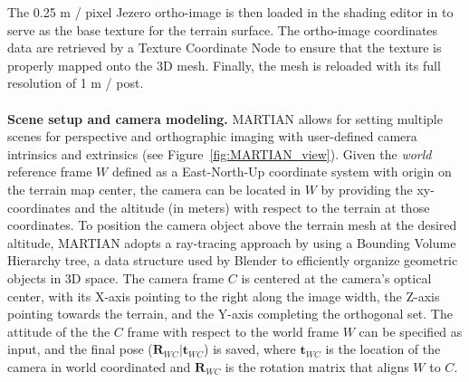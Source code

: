 The 0.25 m / pixel Jezero ortho-image is then loaded in the shading editor in to serve as the base texture for the terrain surface. The ortho-image coordinates data are retrieved by a Texture Coordinate Node to ensure that the texture is properly mapped onto the 3D mesh. Finally, the mesh is reloaded with its full resolution of 1 m / post.
\\
\\
\noindent \textbf{Scene setup and camera modeling.}
MARTIAN allows for setting multiple scenes for perspective and orthographic imaging with user-defined camera intrinsics and extrinsics (see Figure~\ref{fig:MARTIAN_view}). Given the \textit{world} reference frame $W$ defined as a East-North-Up coordinate system with origin on the terrain map center, the camera can be located in $W$ by providing the xy-coordinates and the altitude (in meters) with respect to the terrain at those coordinates. To position the camera object above the terrain mesh at the desired altitude, MARTIAN adopts a ray-tracing approach by using a Bounding Volume Hierarchy tree, a data structure used by Blender to efficiently organize geometric objects in 3D space. The camera frame $C$ is centered at the camera's optical center, with its X-axis pointing to the right along the image width, the Z-axis pointing towards the terrain, and the Y-axis completing the orthogonal set. The attitude of the the $C$ frame with respect to the world frame $W$ can be specified as input, and the final pose ($\mathbf{R}_{WC} \vert \mathbf{t}_{WC}$) is saved, where $\mathbf{t}_{WC}$ is the location of the camera in world coordinated and $\mathbf{R}_{WC}$ is the rotation matrix that aligns $W$ to $C$.
